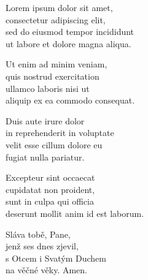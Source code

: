 \begin{translatioMulticol}{5}
Lorem ipsum dolor sit amet,\\
consectetur adipiscing elit,\\
sed do eiusmod tempor incididunt\\
ut labore et dolore magna aliqua.\columnbreak

Ut enim ad minim veniam,\\
quis nostrud exercitation\\
ullamco laboris nisi ut\\
aliquip ex ea commodo consequat.\columnbreak

Duis aute irure dolor\\
in reprehenderit in voluptate\\
velit esse cillum dolore eu\\
fugiat nulla pariatur.\columnbreak

Excepteur sint occaecat\\
cupidatat non proident,\\
sunt in culpa qui officia\\
deserunt mollit anim id est laborum.\columnbreak

Sláva tobě, Pane,\\
jenž ses dnes zjevil,\\
s Otcem i Svatým Duchem\\
na věčné věky.
Amen.
\end{translatioMulticol}
